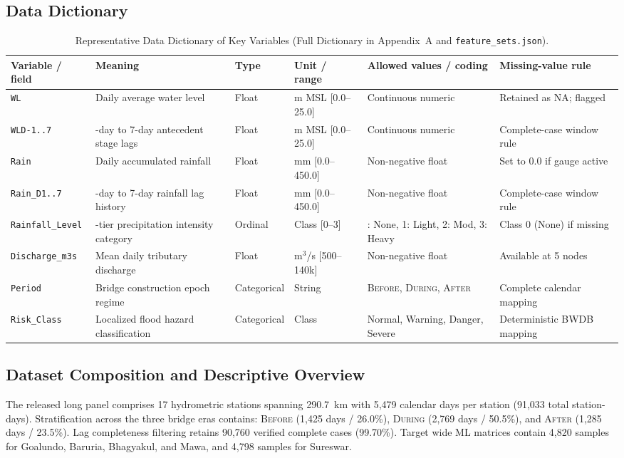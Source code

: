 \documentclass[11pt,a4paper]{article}
\begin{document}
\subsection{Data Dictionary}
\begin{table}[htbp]\centering\scriptsize
\caption{Representative Data Dictionary of Key Variables (Full Dictionary in Appendix~A and \texttt{feature\_sets.json}).}
\label{tab:dictionary}
\begin{tabularx}{\linewidth}{|l|>{\raggedright\arraybackslash}X|l|l|>{\raggedright\arraybackslash}p{2.6cm}|>{\raggedright\arraybackslash}X|}
\hline
\rowcolor{wordheadbg} \textbf{Variable / field} & \textbf{Meaning} & \textbf{Type} & \textbf{Unit / range} & \textbf{Allowed values / coding} & \textbf{Missing-value rule} \\ \hline
\texttt{WL} & Daily average water level & Float & m MSL [0.0--25.0] & Continuous numeric & Retained as NA; flagged \\ \hline
\texttt{WLD-1..7} & 1-day to 7-day antecedent stage lags & Float & m MSL [0.0--25.0] & Continuous numeric & Complete-case window rule \\ \hline
\texttt{Rain} & Daily accumulated rainfall & Float & mm [0.0--450.0] & Non-negative float & Set to 0.0 if gauge active \\ \hline
\texttt{Rain\_D1..7} & 1-day to 7-day rainfall lag history & Float & mm [0.0--450.0] & Non-negative float & Complete-case window rule \\ \hline
\texttt{Rainfall\_Level} & 4-tier precipitation intensity category & Ordinal & Class [0--3] & 0: None, 1: Light, 2: Mod, 3: Heavy & Class 0 (None) if missing \\ \hline
\texttt{Discharge\_m3s} & Mean daily tributary discharge & Float & m$^3$/s [500--140k] & Non-negative float & Available at 5 nodes \\ \hline
\texttt{Period} & Bridge construction epoch regime & Categorical & String & \textsc{Before}, \textsc{During}, \textsc{After} & Complete calendar mapping \\ \hline
\texttt{Risk\_Class} & Localized flood hazard classification & Categorical & Class & Normal, Warning, Danger, Severe & Deterministic BWDB mapping \\ \hline
\end{tabularx}
\end{table}

\subsection{Dataset Composition and Descriptive Overview}
The released long panel comprises 17 hydrometric stations spanning 290.7~km with 5,479 calendar days per station (91,033 total station-days). Stratification across the three bridge eras contains: \textsc{Before} (1,425 days / 26.0\%), \textsc{During} (2,769 days / 50.5\%), and \textsc{After} (1,285 days / 23.5\%). Lag completeness filtering retains 90,760 verified complete cases (99.70\%). Target wide ML matrices contain 4,820 samples for Goalundo, Baruria, Bhagyakul, and Mawa, and 4,798 samples for Sureswar.
\end{document}

